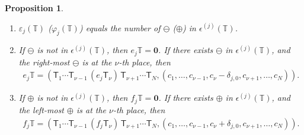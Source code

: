 \documentclass[10pt]{amsart}
\newtheorem{prop}[theo]{Proposition}
\theoremstyle{definition}\newtheorem{defi}[theo]{Definition}
\theoremstyle{remark}\newtheorem{rema}[theo]{Remark}
\newcommand\bm[1]{\boldsymbol{#1}}
\begin{document}
\begin{prop}
\begin{enumerate}[label=(\roman*)]
be the resulting tuple such that no 
$\bm{\oplus}$ 
placed to the left of 
$\bm{\ominus}$.
\item
$\varepsilon_j(\mathbb{T})$ 
(\resp $\varphi_j(\mathbb{T})$) 
equals the number of 
$\bm{\ominus}$ (\resp $\bm{\oplus}$) 
in 
$\epsilon^{(j)}(\mathbb{T})$. 
\item
If 
$\bm{\ominus}$ 
is not in 
$\epsilon^{(j)}(\mathbb{T})$, 
then 
$e_j \mathbb{T} = \bm{0}$. 
If there exists 
$\bm{\ominus}$ 
in 
$\epsilon^{(j)}(\mathbb{T})$, 
and the right-most 
$\bm{\ominus}$ 
is at the $\nu$-th place, then
\begin{align}
e_j \mathbb{T} = \left( \mathsf{T}_1 \cdots \mathsf{T}_{\nu -1} \, (e_j \mathsf{T}_{\nu}) \, \mathsf{T}_{\nu +1} \cdots \mathsf{T}_N , 
(c_1 , \ldots , c_{\nu -1} , c_{\nu} - \delta_{j,0} , c_{\nu +1} , \ldots , c_N) \right).
\end{align}
\item
If 
$\bm{\oplus}$ 
is not in 
$\epsilon^{(j)}(\mathbb{T})$, 
then 
$f_j \mathbb{T} = \bm{0}$.
If there exists 
$\bm{\oplus}$ 
in 
$\epsilon^{(j)}(\mathbb{T})$, 
and the left-most 
$\bm{\oplus}$ 
is at the $\nu$-th place, then
\begin{align}
f_j \mathbb{T} = \left( \mathsf{T}_1 \cdots \mathsf{T}_{\nu -1} \, (f_j \mathsf{T}_{\nu}) \, \mathsf{T}_{\nu +1} \cdots \mathsf{T}_N , 
(c_1 , \ldots , c_{\nu -1} , c_{\nu} + \delta_{j,0} , c_{\nu +1} , \ldots , c_N) \right).
\end{align}
\end{enumerate}
\end{prop}
\end{document}
